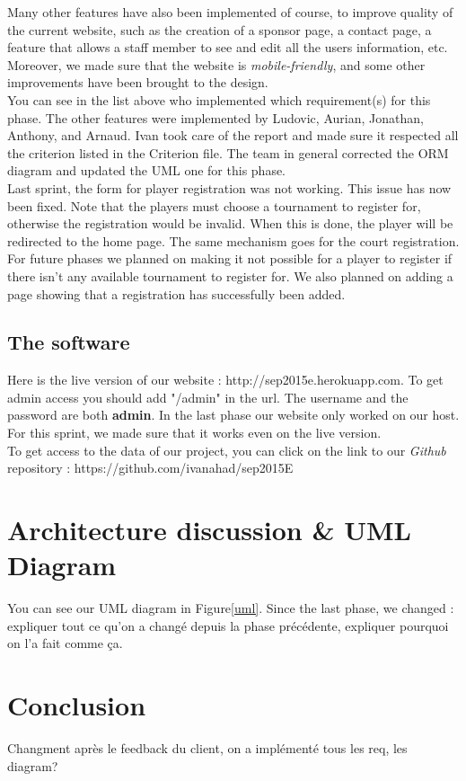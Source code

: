 \documentclass[a4paper, 12pt]{article}
\begin{document}
Many other features have also been implemented of course, to improve quality of the current website, such as the creation of a sponsor page, a contact page, a feature that allows a staff member to see and edit all the users information, etc. Moreover, we made sure that the website is \textit{mobile-friendly}, and some other improvements have been brought to the design.\\

You can see in the list above who implemented which requirement(s) for this phase. The other features were implemented by Ludovic, Aurian, Jonathan, Anthony, and Arnaud. Ivan took care of the report and made sure it respected all the criterion listed in the Criterion file. The team in general corrected the ORM diagram and updated the UML one for this phase. \\

Last sprint, the form for player registration was not working. This issue has now been fixed. Note that the players must choose a tournament to register for, otherwise the registration would be invalid. When this is done, the player will be redirected to the home page. The same mechanism goes for the court registration.  For future phases we planned on making it not possible for a player to register if there isn't any available tournament to register for. We also planned on adding a page showing that a registration has successfully been added.\\

\subsection{The software}

Here is the live version of our website : http://sep2015e.herokuapp.com.  To get admin access you should add "/admin" in the url. The username and the password are both \textbf{admin}. In the last phase our website only worked on our host. For this sprint, we made sure that it works even on the live version.\\

To get access to the data of our project, you can click on the link to our \textit{Github} repository : https://github.com/ivanahad/sep2015E\\ 
\section{Architecture discussion \& UML Diagram}

You can see our UML diagram in Figure\ref{uml}. Since the last phase, we changed : expliquer tout ce qu'on a changé depuis la phase précédente, expliquer pourquoi on l'a fait comme ça.



\section{Conclusion}
Changment après le feedback du client, on a implémenté tous les req, les diagram? 

\begin{appendices}
\noindent

\end{appendices}
\end{document}
